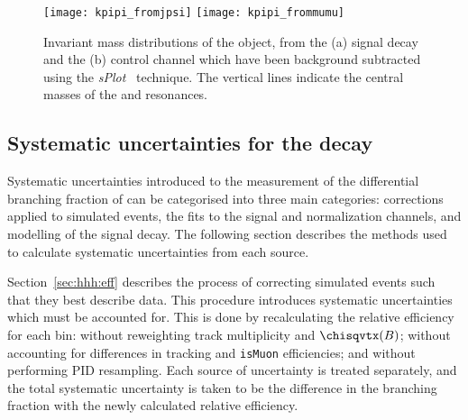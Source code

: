 %
%

\begin{figure}
  \begin{center}
    \texttt{[image: kpipi\_fromjpsi]}
    \texttt{[image: kpipi\_frommumu]}
    \caption[Invariant mass distributions of \kpipi]
    {\small
      Invariant mass distributions of the \kpipi object, from the
      (a) signal decay \btokpipimumu and the
      (b) control channel \btojpsikpipi which have been background subtracted
      using the \emph{sPlot}~\cite{splot} technique.
      The vertical lines indicate the central masses of the  and 
      resonances.
    }
    \label{fig:kpipi:kpipi}
  \end{center}
\end{figure}



\subsection[Systematic uncertainties for the decay \btokpipimumu]
{Systematic uncertainties for the decay \tmath{\btokpipimumu}}
\label{ssec:kpipi:syst}

Systematic uncertainties introduced to the measurement of the differential branching fraction of
\btokpipimumu can be categorised into three main categories:
corrections applied to simulated events,
the fits to the signal and normalization channels, and
modelling of the signal decay.
The following section describes the methods used to calculate systematic uncertainties from each
source.

Section~\ref{sec:hhh:eff} describes the process of correcting simulated events such that they best
describe data.
This procedure introduces systematic uncertainties which must be accounted for.
This is done by recalculating the relative efficiency for each \qsq bin:
without reweighting track multiplicity and $\chisqvtx(B)$;
without accounting for differences in tracking and {\tt isMuon} efficiencies;
and without performing PID resampling.
Each source of uncertainty is treated separately, and the total systematic uncertainty is taken to
be the difference in the branching fraction with the newly calculated relative efficiency.

